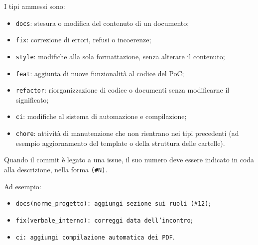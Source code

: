 I tipi ammessi sono:
\begin{itemize}
  \item \texttt{docs}: stesura o modifica del contenuto di un documento;
  \item \texttt{fix}: correzione di errori, refusi o incoerenze;
  \item \texttt{style}: modifiche alla sola formattazione, senza alterare
        il contenuto;
  \item \texttt{feat}: aggiunta di nuove funzionalità al codice del PoC;
  \item \texttt{refactor}: riorganizzazione di codice o documenti senza
        modificarne il significato;
  \item \texttt{ci}: modifiche al sistema di automazione e compilazione;
  \item \texttt{chore}: attività di manutenzione che non rientrano nei
        tipi precedenti (ad esempio aggiornamento del template o della
        struttura delle cartelle).
\end{itemize}

Quando il commit è legato a una issue, il suo numero deve essere indicato
in coda alla descrizione, nella forma \texttt{(\#N)}.

Ad esempio:
\begin{itemize}
  \item \texttt{docs(norme\_progetto): aggiungi sezione sui ruoli (\#12)};
  \item \texttt{fix(verbale\_interno): correggi data dell'incontro};
  \item \texttt{ci: aggiungi compilazione automatica dei PDF}.
\end{itemize}